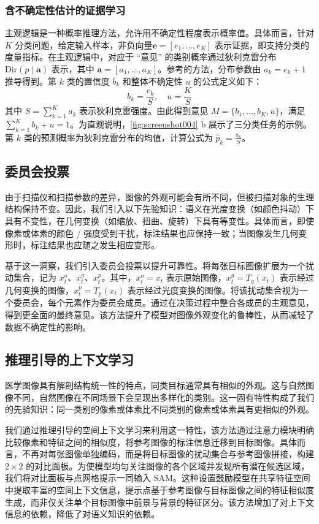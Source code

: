\documentclass[12pt,a4paper]{article}
\begin{document}
	\subsubsection{含不确定性估计的证据学习}
	主观逻辑是一种概率推理方法，允许用不确定性程度表示概率值。具体而言，针对 $K$ 分类问题，给定输入样本，非负向量$\boldsymbol{e} = [e_1, \dots, e_K]$
	表示证据，即支持分类的度量指标。在主观逻辑中，对应于 “意见” 的类别概率通过狄利克雷分布$\text{Dir}(p \mid \boldsymbol{a})$ 表示，其中 $\boldsymbol{a} = [a_1, \dots, a_K]$。参考的方法，分布参数由 $a_k = e_k + 1$ 推导得到。第 $k$ 类的置信度 $b_k$ 和整体不确定性 $u$ 的公式定义如下：
	\[
	b_k = \frac{e_k}{S}, \quad u = \frac{K}{S} \tag{1}
	\]
	其中 $S = \sum_{k=1}^K a_k$ 表示狄利克雷强度。由此得到意见 $M = \{b_1, \dots, b_K, u\}$，满足 $\sum_{k=1}^K b_k + u = 1$。为直观说明，\cref{fig:screenshot004} b 展示了三分类任务的示例。第 $k$ 类的预测概率为狄利克雷分布的均值，计算公式为
	$\hat{p}_k = \frac{a_k}{S}$。
	
	\subsection{委员会投票}
	由于扫描仪和扫描参数的差异，图像的外观可能会有所不同，但被扫描对象的生理结构保持不变。因此，我们引入以下先验知识：语义在光度变换（如颜色抖动）下具有不变性，在几何变换（如缩放、扭曲、旋转）下具有等变性。具体而言，即使像素或体素的颜色 / 强度受到干扰，标注结果也应保持一致；当图像发生几何变形时，标注结果也应随之发生相应变形。
	
	基于这一洞察，我们引入委员会投票以提升可靠性。将每张目标图像扩展为一个扰动集合，记为 $x_t^o$、$x_t^g$、$x_t^p$。其中，$x_t^o = x_t$ 表示原始图像，$x_t^g = T_g(x_t)$ 表示经过几何变换的图像，$x_t^p = T_p(x_t)$ 表示经过光度变换的图像。将该扰动集合视为一个委员会，每个元素作为委员会成员。通过在决策过程中整合各成员的主观意见，得到更全面的最终意见。该方法提升了模型对图像外观变化的鲁棒性，从而减轻了数据不确定性的影响。
	
	\subsection{推理引导的上下文学习}
	医学图像具有解剖结构统一性的特点，同类目标通常具有相似的外观。这与自然图像不同，自然图像在不同场景下会呈现出多样化的类别。这一固有特性构成了我们的先验知识：同一类别的像素或体素比不同类别的像素或体素具有更相似的外观。
	
	我们通过推理引导的空间上下文学习来利用这一特性，该方法通过注意力模块明确比较像素和特征之间的相似度，将参考图像的标注信息迁移到目标图像。具体而言，不再对每张图像单独编码，而是将目标图像的扰动集合与参考图像拼接，构建 $2 \times 2$ 的对比面板。为使模型均匀关注图像的各个区域并发现所有潜在候选区域，我们将对比面板与点网格提示一同输入 SAM。这种设置鼓励模型在共享特征空间中提取丰富的空间上下文信息，提示点基于参考图像与目标图像之间的特征相似度生成，而非仅关注单个目标图像中前景与背景的特征区分。该方法增加了对上下文信息的依赖，降低了对语义知识的依赖。
	
\end{document}
